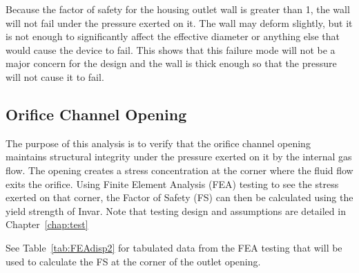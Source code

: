 \documentclass[12pt, letterpaper]{report}%
\newcounter{mycounter}           %
\newcounter{sub}[mycounter]      %
\begin{document}
	Because the factor of safety for the housing outlet wall is greater than 1, the wall will not fail under the pressure exerted on it. The wall may deform slightly, but it 
	is not enough to significantly affect the effective diameter or anything else that would cause the device to fail. This shows that this failure mode will
	not be a major concern for the design and the wall is thick enough so that the pressure will not cause it to fail. 


\subsection{Orifice Channel Opening}

	The purpose of this analysis is to verify that the orifice channel opening maintains structural integrity under the pressure exerted on it by the internal 
	gas flow. The opening creates a stress concentration at the corner where the fluid flow exits the orifice. Using Finite Element Analysis (FEA) testing to see
	the stress exerted on that corner, the Factor of Safety (FS) can then be calculated using the yield strength of Invar. Note that testing design and assumptions are detailed in Chapter~\ref{chap:test}

	See Table~\ref{tab:FEAdisp2} for tabulated data from the FEA testing that will be used to calculate the FS at the corner of the outlet opening.
\end{document}
